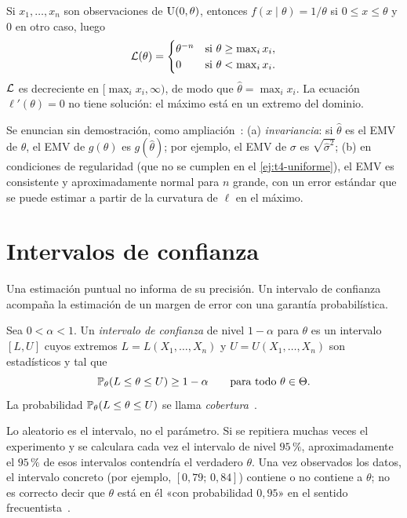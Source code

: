 \begin{ejemplo}\label{ej:t4-uniforme}
Si $x_1,\dots,x_n$ son observaciones de $\operatorname{U}(0,\theta)$, entonces $f(x\mid\theta)=1/\theta$ si $0\le x\le\theta$ y $0$ en otro caso, luego
\[
\mathcal{L}(\theta)=\begin{cases}\theta^{-n}&\text{si }\theta\ge\max_ix_i,\\0&\text{si }\theta<\max_ix_i.\end{cases}
\]
$\mathcal{L}$ es decreciente en $[\max_ix_i,\infty)$, de modo que $\widehat\theta=\max_ix_i$. La ecuación $\ell'(\theta)=0$ no tiene solución: el máximo está en un extremo del dominio.
\end{ejemplo}

\begin{observacion}\label{obs:t4-propiedades}
Se enuncian sin demostración, como ampliación~\cite[cap.~9]{wasserman}: (a) \emph{invariancia}: si $\widehat\theta$ es el EMV de $\theta$, el EMV de $g(\theta)$ es $g(\widehat\theta)$; por ejemplo, el EMV de $\sigma$ es $\sqrt{\widehat\sigma^{2}}$; (b) en condiciones de regularidad (que no se cumplen en el \cref{ej:t4-uniforme}), el EMV es consistente y aproximadamente normal para $n$ grande, con un error estándar que se puede estimar a partir de la curvatura de $\ell$ en el máximo.
\end{observacion}

\section{Intervalos de confianza}

Una estimación puntual no informa de su precisión. Un intervalo de confianza acompaña la estimación de un margen de error con una garantía probabilística.

\begin{definicion}\label{def:t4-ic}
Sea $0<\alpha<1$. Un \emph{intervalo de confianza} de nivel $1-\alpha$ para $\theta$ es un intervalo $[L,U]$ cuyos extremos $L=L(X_1,\dots,X_n)$ y $U=U(X_1,\dots,X_n)$ son estadísticos y tal que
\[
\mathbb{P}_\theta(L\le\theta\le U)\ge1-\alpha\qquad\text{para todo }\theta\in\Theta.
\]
La probabilidad $\mathbb{P}_\theta(L\le\theta\le U)$ se llama \emph{cobertura}~\cite[cap.~6]{wasserman}.
\end{definicion}

\begin{observacion}[Interpretación]\label{obs:t4-interpretacion}
Lo aleatorio es el intervalo, no el parámetro. Si se repitiera muchas veces el experimento y se calculara cada vez el intervalo de nivel $95\,\%$, aproximadamente el $95\,\%$ de esos intervalos contendría el verdadero $\theta$. Una vez observados los datos, el intervalo concreto (por ejemplo, $[0{,}79;\allowbreak\,0{,}84]$) contiene o no contiene a $\theta$; no es correcto decir que $\theta$ está en él «con probabilidad $0{,}95$» en el sentido frecuentista~\cite[lectura~23a]{mit1805}.
\end{observacion}

